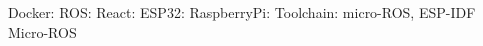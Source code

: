 \begin{flushleft}
    Docker:
    ROS:
    React:
    ESP32:
    RaspberryPi:
    Toolchain: micro-ROS, ESP-IDF
    Micro-ROS

\end{flushleft}